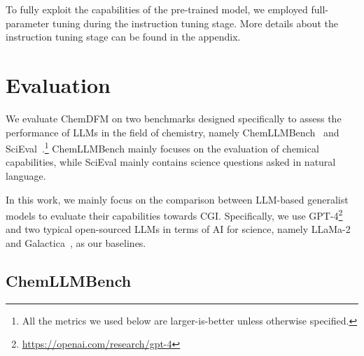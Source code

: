 To fully exploit the capabilities of the pre-trained model, we employed full-parameter tuning during the instruction tuning stage. More details about the instruction tuning stage can be found in the appendix.

\section{Evaluation}\label{sec:obj}

We evaluate ChemDFM on two benchmarks designed specifically to assess the performance of LLMs in the field of chemistry, namely ChemLLMBench~\cite{guo2023large} and SciEval~\cite{sun2023scieval}.\footnote{All the metrics we used below are larger-is-better unless otherwise specified.}
ChemLLMBench mainly focuses on the evaluation of chemical capabilities, while SciEval mainly contains science questions asked in natural language.

In this work, we mainly focus on the comparison between LLM-based generalist models to evaluate their capabilities towards CGI. Specifically, we use GPT-4\footnote{\url{https://openai.com/research/gpt-4}} and two typical open-sourced LLMs in terms of AI for science, namely LLaMa-2~\cite{touvron2023llama2} and Galactica~\cite{taylor2022galactica}, as our baselines.

\subsection{ChemLLMBench}\label{chemllmbench}

